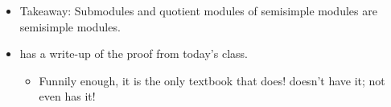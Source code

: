 \documentclass[../notes.tex]{subfiles}
\begin{document}
\begin{itemize}
\begin{enumerate}
\begin{proof}
            Claim: $(L'\cap N)\bigoplus L=N$. Not intersecting: $L'\cap N\cap L\subset L'\cap L=0$. Summing to the whole thing: Let $n\in N$ be arbitrary. Then since $n\in M$, there exists $\ell,\ell'\in L,L'$ such that $n=\ell+\ell'$. But since $n,\ell\in N$, we must have $\ell'\in N$ as well. Therefore, $\ell'\in L'\cap N$.
        \end{proof}
        \item $M/N$ is semisimple.
    \end{enumerate}
    \item Takeaway: Submodules and quotient modules of semisimple modules are semisimple modules.
    \item \textcite{bib:Lang} has a write-up of the proof from today's class.
    \begin{itemize}
        \item Funnily enough, it is the only textbook that does! \textcite{bib:FultonHarris} doesn't have it; not even \textcite{bib:Etingof} has it!
    \end{itemize}
\end{itemize}
\end{document}
